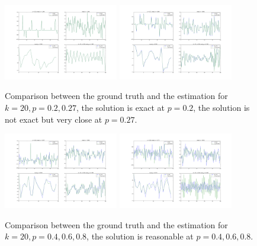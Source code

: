 \documentclass[letter, 10pt]{article}
\numberwithin{equation}{section}
\begin{document}
\begin{figure}
\includegraphics[width=5cm,keepaspectratio]{fig2/04_bShort_k_40_len_xSparse_w_Gaus_AGauss_n100_k20_p0_20_sigma0_00.png}
 \includegraphics[width=5cm,keepaspectratio]{fig2/04_bShort_k_40_len_xSparse_w_Gaus_AGauss_n100_k20_p0_27_sigma0_00.png}
\caption{Comparison between the ground truth and the estimation for $k=20, p=0.2, 0.27$, the solution is exact at $p=0.2$, the solution is not exact but very close at $p= 0.27$. }
\end{figure}

\begin{figure}
\includegraphics[width=5cm,keepaspectratio]{fig2/bShort_k_lenKnown_xSparse_w_Gaus_AGauss_n100_k20_p0_60_sigma0_00.png}
   \includegraphics[width=5cm,keepaspectratio]{fig2/bShort_k_lenKnown_xSparse_w_Gaus_AGauss_n100_k20_p0_80_sigma0_00.png}
\caption{Comparison between the ground truth and the estimation for $k=20, p= 0.4, 0.6, 0.8$, the solution is reasonable at $p=0.4, 0.6, 0.8$. }
\end{figure}
\end{document}
